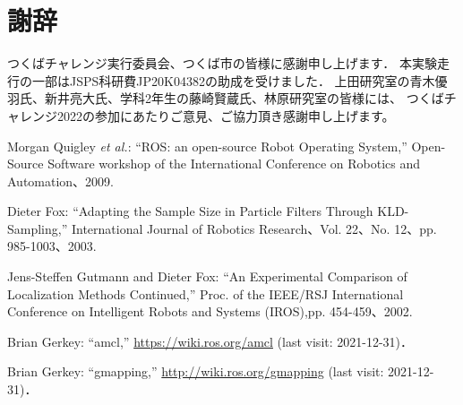 \documentclass[twocolumn,9pt]{jsproceedings}
\begin{document}
\section*{謝辞}

つくばチャレンジ実行委員会、つくば市の皆様に感謝申し上げます．
本実験走行の一部はJSPS科研費JP20K04382の助成を受けました．
上田研究室の青木優羽氏、新井亮大氏、学科2年生の藤崎賢蔵氏、林原研究室の皆様には、
つくばチャレンジ2022の参加にあたりご意見、ご協力頂き感謝申し上げます。


\footnotesize
\begin{thebibliography}{99}
	  Morgan Quigley {\it et al.}: ``ROS: an open-source Robot Operating System,'' 
Open-Source Software workshop of the International Conference on Robotics and Automation、2009. 

Dieter Fox:
``Adapting the Sample Size in Particle Filters Through KLD-Sampling,''
International Journal of Robotics Research、Vol. 22、No. 12、pp. 985-1003、2003. 

Jens-Steffen Gutmann and Dieter Fox: 
``An Experimental Comparison of Localization Methods Continued,''
Proc. of the IEEE/RSJ International Conference on Intelligent Robots and Systems (IROS),pp. 454-459、2002.
  

  
  
  
  Brian Gerkey: ``amcl,'' \url{https://wiki.ros.org/amcl} (last visit: 2021-12-31)．

  Brian Gerkey: ``gmapping,'' \url{http://wiki.ros.org/gmapping} (last visit: 2021-12-31)．
  
  

\end{thebibliography}
\end{document}
